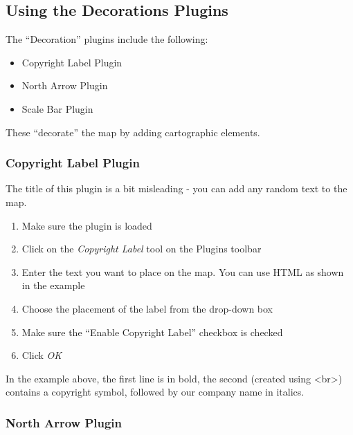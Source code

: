 \subsection{Using the Decorations Plugins}

The ``Decoration'' plugins include the following:

\begin{itemize}
\item Copyright Label Plugin
\item North Arrow Plugin
\item Scale Bar Plugin
\end{itemize}
 
These ``decorate'' the map by adding cartographic elements. 

\subsubsection{Copyright Label Plugin}


The title of this plugin is a bit misleading - you can add any random text to the map.

\begin{enumerate}
\item Make sure the plugin is loaded
\item Click on the \textsl{Copyright Label} tool on the Plugins toolbar
\item Enter the text you want to place on the map. You can use HTML as
  shown in the example
\item Choose the placement of the label from the drop-down box
\item Make sure the ``Enable Copyright Label'' checkbox is checked
\item Click \textsl{OK} 
\end{enumerate}

In the example above, the first line is in bold, the second (created using
\textless br\textgreater) contains a copyright symbol, followed by our company name in
italics.

\subsubsection{North Arrow Plugin}

